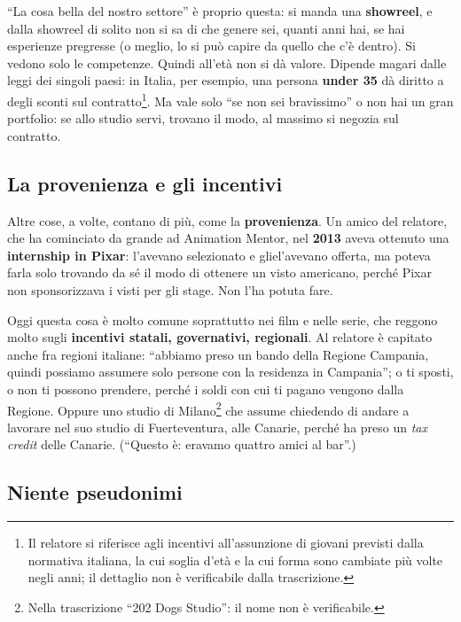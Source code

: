 ``La cosa bella del nostro settore'' è proprio questa: si manda una
\textbf{showreel}, e dalla showreel di solito non si sa di che genere sei,
quanti anni hai, se hai esperienze pregresse (o meglio, lo si può capire da
quello che c'è dentro). Si vedono solo le competenze. Quindi all'età non si
dà valore. Dipende magari dalle leggi dei singoli paesi: in Italia, per
esempio, una persona \textbf{under 35} dà diritto a degli sconti sul
contratto\footnote{Il relatore si riferisce agli incentivi all'assunzione di
giovani previsti dalla normativa italiana, la cui soglia d'età e la cui forma
sono cambiate più volte negli anni; il dettaglio non è verificabile dalla
trascrizione.}. Ma vale solo ``se non sei bravissimo'' o non hai un gran
portfolio: se allo studio servi, trovano il modo, al massimo si negozia sul
contratto.

\subsection{La provenienza e gli incentivi}

Altre cose, a volte, contano di più, come la \textbf{provenienza}. Un amico
del relatore, che ha cominciato da grande ad Animation Mentor, nel
\textbf{2013} aveva ottenuto una \textbf{internship in Pixar}: l'avevano
selezionato e gliel'avevano offerta, ma poteva farla solo trovando da sé il
modo di ottenere un visto americano, perché Pixar non sponsorizzava i visti
per gli stage. Non l'ha potuta fare.

Oggi questa cosa è molto comune soprattutto nei film e nelle serie, che
reggono molto sugli \textbf{incentivi statali, governativi, regionali}. Al
relatore è capitato anche fra regioni italiane: ``abbiamo preso un bando
della Regione Campania, quindi possiamo assumere solo persone con la
residenza in Campania''; o ti sposti, o non ti possono prendere, perché i
soldi con cui ti pagano vengono dalla Regione. Oppure uno studio di
Milano\footnote{Nella trascrizione ``202 Dogs Studio'': il nome non è
verificabile.} che assume chiedendo di andare a lavorare nel suo studio di
Fuerteventura, alle Canarie, perché ha preso un \emph{tax credit} delle
Canarie. (``Questo è: eravamo quattro amici al bar''.)

\subsection{Niente pseudonimi}

